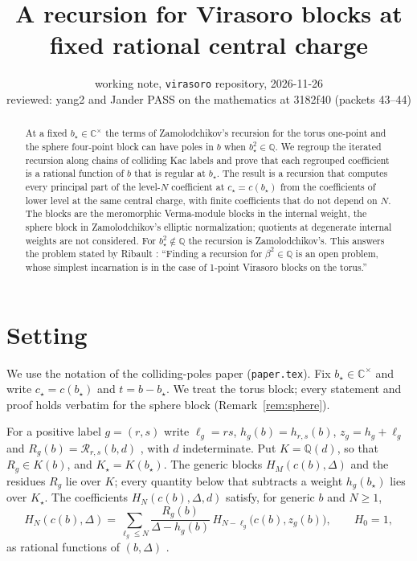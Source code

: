 \documentclass[11pt]{article}
\title{A recursion for Virasoro blocks at fixed rational central charge}
\author{working note, \texttt{virasoro} repository, 2026-11-26\\ reviewed: yang2 and Jander PASS on the mathematics at 3182f40 (packets 43--44)}
\date{}
\theoremstyle{definition}
\theoremstyle{remark}
\begin{document}
\maketitle

\begin{abstract}
At a fixed $b_\star\in\mathbb C^\times$ the terms of Zamolodchikov's recursion
for the torus one-point and the sphere four-point block can have poles in $b$
when $b_\star^2\in\mathbb Q$.  We regroup the iterated recursion along chains
of colliding Kac labels and prove that each regrouped coefficient is a rational
function of $b$ that is regular at $b_\star$.  The result is a recursion that
computes every principal part of the level-$N$ coefficient at $c_\star=c(b_\star)$
from the coefficients of lower level at the same central charge, with finite
coefficients that do not depend on $N$.  The blocks are the meromorphic
Verma-module blocks in the internal weight, the sphere block in
Zamolodchikov's elliptic normalization; quotients at degenerate internal
weights are not considered.  For $b_\star^2\notin\mathbb Q$ the recursion is
Zamolodchikov's.  This answers the problem stated by Ribault
\cite[\S4.3.3]{Rib}: ``Finding a recursion for $\beta^2\in\mathbb Q$ is an open
problem, whose simplest incarnation is in the case of 1-point Virasoro blocks on
the torus.''
\end{abstract}

\section{Setting}

We use the notation of the colliding-poles paper \cite{CP} (\texttt{paper.tex}).
Fix $b_\star\in\mathbb C^\times$ and write $c_\star=c(b_\star)$ and
$t=b-b_\star$.  We treat the torus block; every statement and proof holds
verbatim for the sphere block (Remark~\ref{rem:sphere}).

For a positive label $g=(r,s)$ write $\ell_g=rs$, $h_g(b)=h_{r,s}(b)$,
$z_g=h_g+\ell_g$ and $R_g(b)=\mathcal R_{r,s}(b,d)$ \cite[Definition~6.1]{CP},
with $d$ indeterminate.  Put $K=\mathbb Q(d)$, so that $R_g\in K(b)$, and
$K_\star=K(b_\star)$.  The generic blocks $H_M(c(b),\Delta)$ and the residues
$R_g$ lie over $K$; every quantity below that subtracts a weight $h_g(b_\star)$
lies over $K_\star$.  The
coefficients $H_N(c(b),\Delta,d)$ satisfy, for generic $b$ and $N\ge1$,
\begin{equation}\label{eq:generic}
 H_N(c(b),\Delta)=\sum_{\ell_g\le N}\frac{R_g(b)}{\Delta-h_g(b)}\,
 H_{N-\ell_g}\bigl(c(b),z_g(b)\bigr),\qquad H_0=1,
\end{equation}
as rational functions of $(b,\Delta)$ \cite[Proposition~6.4]{CP}.
\end{document}
